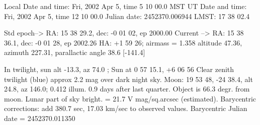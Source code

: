 Local Date and time: Fri, 2002 Apr  5, time   5 10 00.0  MST
   UT Date and time: Fri, 2002 Apr  5, time  12 10 00.0
Julian date: 2452370.006944   LMST:  17 38 02.4

Std epoch--> RA: 15 38 29.2, dec:  -0 01 02, ep 2000.00
Current  --> RA: 15 38 36.1, dec:  -0 01 28, ep 2002.26
HA:  +1 59 26; airmass =    1.358
altitude  47.36, azimuth 227.31, parallactic angle 38.6  [-141.4]

In twilight, sun alt -13.3, az  74.0 ; Sun at  0 57 15.1,  +6 06 56
Clear zenith twilight (blue) approx  2.2  mag over dark night sky.
Moon: 19 53 48, -24 38.4, alt  24.8, az 146.0; 0.412 illum.
0.9 days after last quarter.  Object is  66.3 degr. from moon.
Lunar part of sky bright. =  21.7 V mag/sq.arcsec (estimated).
Barycentric corrections: add  380.7 sec, 17.03 km/sec to observed values.
Barycentric Julian date = 2452370.011350

